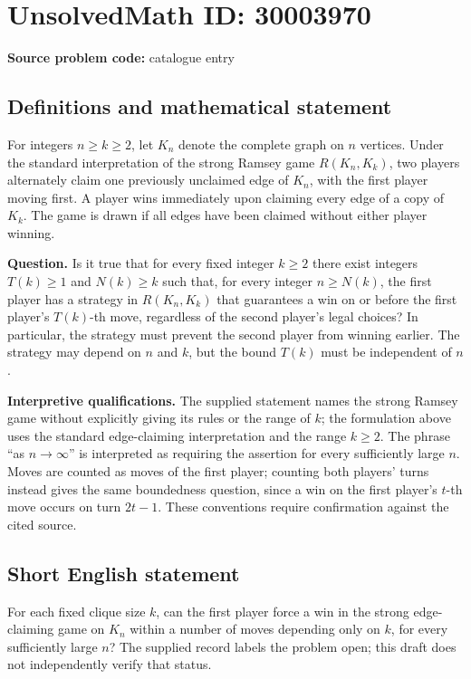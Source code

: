 \documentclass[11pt]{article}
\begin{document}
\section*{UnsolvedMath ID: 30003970}
\textbf{Source problem code:} catalogue entry
\subsection{Definitions and mathematical statement}
For integers \(n\geq k\geq 2\), let \(K_n\) denote the complete graph on \(n\) vertices. Under the standard interpretation of the strong Ramsey game \(R(K_n,K_k)\), two players alternately claim one previously unclaimed edge of \(K_n\), with the first player moving first. A player wins immediately upon claiming every edge of a copy of \(K_k\). The game is drawn if all edges have been claimed without either player winning.

\textbf{Question.} Is it true that for every fixed integer \(k\geq 2\) there exist integers \(T(k)\geq 1\) and \(N(k)\geq k\) such that, for every integer \(n\geq N(k)\), the first player has a strategy in \(R(K_n,K_k)\) that guarantees a win on or before the first player's \(T(k)\)-th move, regardless of the second player's legal choices? In particular, the strategy must prevent the second player from winning earlier. The strategy may depend on \(n\) and \(k\), but the bound \(T(k)\) must be independent of \(n\).

\textbf{Interpretive qualifications.} The supplied statement names the strong Ramsey game without explicitly giving its rules or the range of \(k\); the formulation above uses the standard edge-claiming interpretation and the range \(k\geq 2\). The phrase ``as \(n\to\infty\)'' is interpreted as requiring the assertion for every sufficiently large \(n\). Moves are counted as moves of the first player; counting both players' turns instead gives the same boundedness question, since a win on the first player's \(t\)-th move occurs on turn \(2t-1\). These conventions require confirmation against the cited source.
\subsection{Short English statement}
For each fixed clique size \(k\), can the first player force a win in the strong edge-claiming game on \(K_n\) within a number of moves depending only on \(k\), for every sufficiently large \(n\)? The supplied record labels the problem open; this draft does not independently verify that status.
\end{document}
